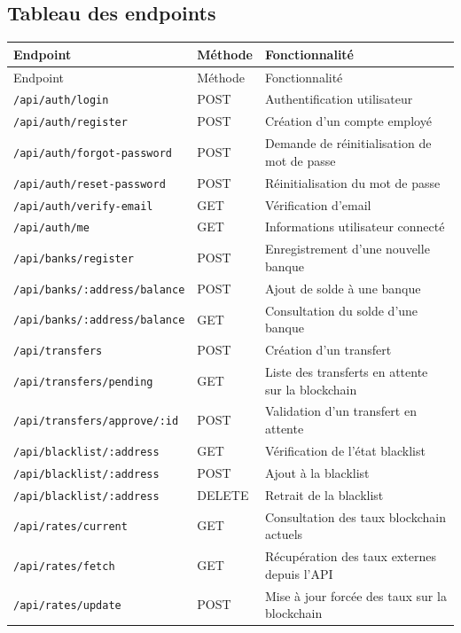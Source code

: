 \documentclass[a4paper,12pt]{report}
\begin{document}
\subsection{Tableau des endpoints}
\begin{longtable}{p{4cm}p{4cm}p{7cm}}
\toprule
Endpoint & Méthode & Fonctionnalité \\
\midrule
\endfirsthead
\toprule
Endpoint & Méthode & Fonctionnalité \\
\midrule
\endhead
\bottomrule
\endfoot
\texttt{/api/auth/login} & POST & Authentification utilisateur \\
\texttt{/api/auth/register} & POST & Création d'un compte employé \\
\texttt{/api/auth/forgot-password} & POST & Demande de réinitialisation de mot de passe \\
\texttt{/api/auth/reset-password} & POST & Réinitialisation du mot de passe \\
\texttt{/api/auth/verify-email} & GET & Vérification d'email \\
\texttt{/api/auth/me} & GET & Informations utilisateur connecté \\
\texttt{/api/banks/register} & POST & Enregistrement d'une nouvelle banque \\
\texttt{/api/banks/:address/balance} & POST & Ajout de solde à une banque \\
\texttt{/api/banks/:address/balance} & GET & Consultation du solde d'une banque \\
\texttt{/api/transfers} & POST & Création d'un transfert \\
\texttt{/api/transfers/pending} & GET & Liste des transferts en attente sur la blockchain \\
\texttt{/api/transfers/approve/:id} & POST & Validation d'un transfert en attente \\
\texttt{/api/blacklist/:address} & GET & Vérification de l'état blacklist \\
\texttt{/api/blacklist/:address} & POST & Ajout à la blacklist \\
\texttt{/api/blacklist/:address} & DELETE & Retrait de la blacklist \\
\texttt{/api/rates/current} & GET & Consultation des taux blockchain actuels \\
\texttt{/api/rates/fetch} & GET & Récupération des taux externes depuis l'API \\
\texttt{/api/rates/update} & POST & Mise à jour forcée des taux sur la blockchain \\

\end{longtable}
\end{document}
